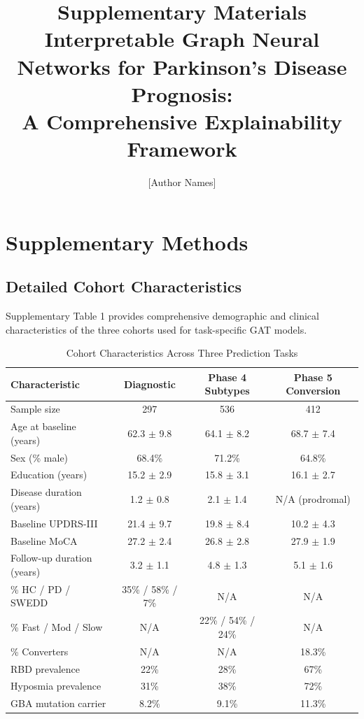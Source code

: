 \documentclass[11pt]{article}
\title{\textbf{Supplementary Materials} \\
Interpretable Graph Neural Networks for Parkinson's Disease Prognosis: \\
A Comprehensive Explainability Framework}
\author{[Author Names]}
\date{}
\begin{document}
\maketitle

\tableofcontents
\newpage

\section{Supplementary Methods}

\subsection{Detailed Cohort Characteristics}

Supplementary Table 1 provides comprehensive demographic and clinical characteristics of the three cohorts used for task-specific GAT models.

\begin{table}[H]
\centering
\caption{Cohort Characteristics Across Three Prediction Tasks}
\label{tab:supp_cohort}
\begin{tabular}{lccc}
\toprule
\textbf{Characteristic} & \textbf{Diagnostic} & \textbf{Phase 4 Subtypes} & \textbf{Phase 5 Conversion} \\
\midrule
Sample size & 297 & 536 & 412 \\
Age at baseline (years) & 62.3 $\pm$ 9.8 & 64.1 $\pm$ 8.2 & 68.7 $\pm$ 7.4 \\
Sex (\% male) & 68.4\% & 71.2\% & 64.8\% \\
Education (years) & 15.2 $\pm$ 2.9 & 15.8 $\pm$ 3.1 & 16.1 $\pm$ 2.7 \\
Disease duration (years) & 1.2 $\pm$ 0.8 & 2.1 $\pm$ 1.4 & N/A (prodromal) \\
Baseline UPDRS-III & 21.4 $\pm$ 9.7 & 19.8 $\pm$ 8.4 & 10.2 $\pm$ 4.3 \\
Baseline MoCA & 27.2 $\pm$ 2.4 & 26.8 $\pm$ 2.8 & 27.9 $\pm$ 1.9 \\
Follow-up duration (years) & 3.2 $\pm$ 1.1 & 4.8 $\pm$ 1.3 & 5.1 $\pm$ 1.6 \\
\% HC / PD / SWEDD & 35\% / 58\% / 7\% & N/A & N/A \\
\% Fast / Mod / Slow & N/A & 22\% / 54\% / 24\% & N/A \\
\% Converters & N/A & N/A & 18.3\% \\
RBD prevalence & 22\% & 28\% & 67\% \\
Hyposmia prevalence & 31\% & 38\% & 72\% \\
GBA mutation carrier & 8.2\% & 9.1\% & 11.3\% \\
\bottomrule
\end{tabular}
\end{table}
\end{document}
